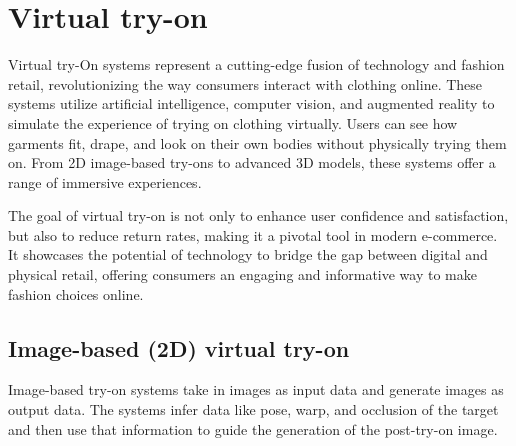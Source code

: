 \section{Virtual try-on} \label{section:vton}
	Virtual try-On systems represent a cutting-edge fusion of technology and fashion retail, revolutionizing the way consumers interact with clothing online. These systems utilize artificial intelligence, computer vision, and augmented reality to simulate the experience of trying on clothing virtually. Users can see how garments fit, drape, and look on their own bodies without physically trying them on. From 2D image-based try-ons to advanced 3D models, these systems offer a range of immersive experiences.
	
	The goal of virtual try-on is not only to enhance user confidence and satisfaction, but also to reduce return rates, making it a pivotal tool in modern e-commerce. It showcases the potential of technology to bridge the gap between digital and physical retail, offering consumers an engaging and informative way to make fashion choices online.

	\subsection{Image-based (2D) virtual try-on}
		Image-based try-on systems take in images as input data and generate images as output data. The systems infer data like pose, warp, and occlusion of the target and then use that information to guide the generation of the post-try-on image.





